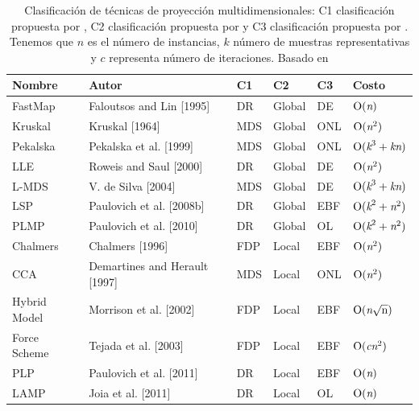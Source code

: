 \begin{table}[!hbt]
\centering
    \begin{tabular}{ | l | l | l | l | l |  l |}
    \hline
    \textbf{Nombre} &\textbf{Autor} & \textbf{C1} & \textbf{C2} &  \textbf{C3} & \textbf{Costo} \\ \hline
    FastMap & Faloutsos and Lin [1995] & DR & Global & DE & $\mathrm{O(\emph{n})}$  \\ \hline
    Kruskal & Kruskal [1964] & MDS & Global & \ac{ONL} & $\mathrm{O(\emph{n}^2)}$  \\ \hline
    Pekalska & Pekalska et al. [1999] & \ac{MDS} & Global & \ac{ONL} & $\mathrm{O(\emph{k}^3+\emph{kn})}$\\ \hline
    LLE & Roweis and Saul [2000] & \ac{DR} & Global & \ac{DE} & $\mathrm{O(\emph{n}^2)}$   \\ \hline
    L-MDS & V. de Silva [2004] & \ac{MDS} & Global & \ac{DE} & $\mathrm{O(\emph{k}^3+\emph{kn})}$   \\ \hline
    LSP & Paulovich et al. [2008b] & \ac{DR} & Global & \ac{EBF} & $\mathrm{O(\emph{k}^2+\emph{n}^2)}$   \\ \hline
    PLMP & Paulovich et al. [2010] & \ac{DR} & Global & \ac{OL} & $\mathrm{O(\emph{k}^2+\emph{n}^2)}$  \\ \hline
    Chalmers & Chalmers [1996] & \ac{FDP} & Local & \ac{EBF} & $\mathrm{O(\emph{n}^2)}$   \\ \hline
    CCA & Demartines and Herault [1997] & \ac{MDS} & Local & \ac{ONL} & $\mathrm{O(\emph{n}^2)}$   \\ \hline
    Hybrid Model & Morrison et al. [2002] & \ac{FDP} & Local & \ac{EBF} & $\mathrm{O(\emph{n}\sqrt{n})}$  \\ \hline
    Force Scheme & Tejada et al. [2003] & FDP & Local & \ac{EBF} & $\mathrm{O(\emph{cn}^2)}$   \\ \hline
    PLP & Paulovich et al. [2011] & \ac{DR} & Local & \ac{EBF} & $\mathrm{O(\emph{n})}$   \\ \hline
    LAMP & Joia et al. [2011] & \ac{DR} & Local & \ac{OL} & $\mathrm{O(\emph{n})}$  \\ 
  
    \hline
    \end{tabular}
    \caption{\label{tab:tabla1} Clasificación de técnicas de proyección multidimensionales: C1 clasificación propuesta por \cite{paulovich2008mapeamento} , C2 clasificación propuesta por \cite{joia2011local} y C3 clasificación propuesta por \cite{Paulovich2010Two}. Tenemos que $n$ es el número de instancias, $k$ número de muestras representativas y $c$ representa número de iteraciones. Basado en \cite{Paulovich2010Two}}
\end{table}

